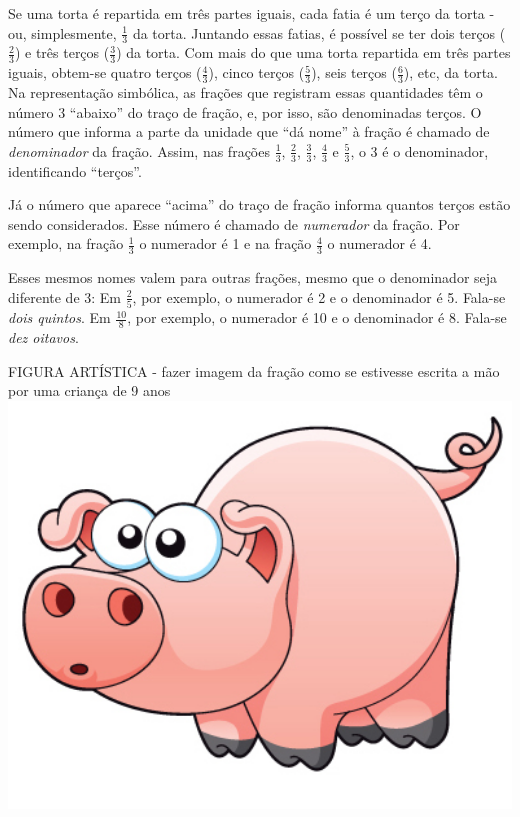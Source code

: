 \documentclass[a4,12pt]{book}
\begin{document}
Se uma torta é repartida em três partes iguais, cada fatia é um terço da torta - ou, simplesmente, $\frac{1}{3}$ da torta. Juntando essas fatias, é possível se ter dois terços ($\frac{2}{3}$) e três terços ($\frac{3}{3}$) da torta. Com mais do que uma torta repartida em três partes iguais, obtem-se quatro terços ($\frac{4}{3}$), cinco terços ($\frac{5}{3}$), seis terços ($\frac{6}{3}$), etc, da torta. Na representação simbólica, as frações que registram essas quantidades têm o número 3 ``abaixo'' do traço de fração, e, por isso, são denominadas terços. O número que informa a parte da unidade que ``dá nome'' à fração é chamado de {\it denominador} da fração. Assim, nas frações $\frac{1}{3}$, $\frac{2}{3}$, $\frac{3}{3}$,  $\frac{4}{3}$ e $\frac{5}{3}$, o 3 é o denominador, identificando ``terços''.


Já o número que aparece ``acima'' do traço de fração informa quantos terços estão sendo considerados. Esse número é chamado de {\it numerador} da fração. Por exemplo, na fração $\frac{1}{3}$ o numerador é 1 e na fração $\frac{4}{3}$ o numerador é 4.

Esses mesmos nomes valem para outras frações, mesmo que o denominador seja diferente de 3:\mbox{} \newline
Em $\frac{2}{5}$, por exemplo, o numerador é 2 e o denominador é 5. Fala-se {\it dois quintos}.\mbox{} \newline
Em $\frac{10}{8}$, por exemplo, o numerador é 10 e o denominador é 8. Fala-se {\it dez oitavos}.




\begin{imagem*}[breakable]{}{}   FIGURA ARTÍSTICA - fazer imagem da fração como se estivesse escrita a mão por uma criança de 9 anos   \mbox{} \newline        \includegraphics[width=480pt, keepaspectratio]{pig}   \end{imagem*}
\end{document}
